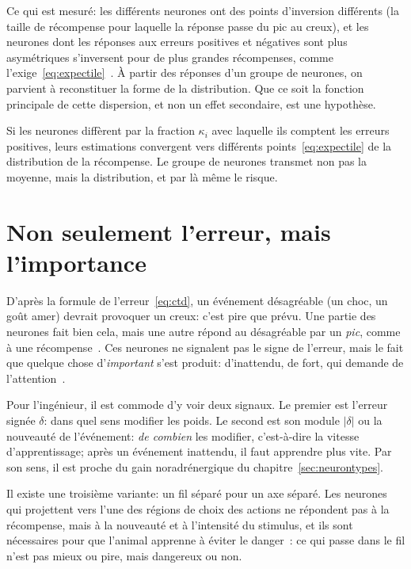 Ce qui est mesuré: les différents neurones  ont des \og points d'inversion\fg{} différents (la taille de récompense pour laquelle la réponse passe du pic au creux), et les neurones dont les réponses aux erreurs positives et négatives sont plus asymétriques s'inversent pour de plus grandes récompenses, comme l'exige~\eqref{eq:expectile}~\cite{Dabney2020}. À partir des réponses d'un groupe de neurones, on parvient à reconstituer la forme de la distribution. Que ce soit la fonction principale de cette dispersion, et non un effet secondaire, est une hypothèse.

\begin{keyblock}
\begin{proposition}
\label{prop:expectile}
Si les neurones  diffèrent par la fraction $\kappa_i$ avec laquelle ils comptent les erreurs positives, leurs estimations convergent vers différents points~\eqref{eq:expectile} de la distribution de la récompense. Le groupe de neurones transmet non pas la moyenne, mais la distribution, et par là même le risque.
\end{proposition}
\end{keyblock}

\section{Non seulement l'erreur, mais l'importance}

D'après la formule de l'erreur~\eqref{eq:ctd}, un événement désagréable (un choc, un goût amer) devrait provoquer un creux: c'est pire que prévu. Une partie des neurones  fait bien cela, mais une autre répond au désagréable par un \emph{pic}, comme à une récompense~\cite{Matsumoto2009}. Ces neurones ne signalent pas le signe de l'erreur, mais le fait que quelque chose d'\emph{important} s'est produit: d'inattendu, de fort, qui demande de l'attention~\cite{BrombergMartin2010}.

Pour l'ingénieur, il est commode d'y voir deux signaux. Le premier est l'erreur signée $\delta$: dans quel sens modifier les poids. Le second est son module $|\delta|$ ou la nouveauté de l'événement: \emph{de combien} les modifier, c'est-à-dire la vitesse d'apprentissage; après un événement inattendu, il faut apprendre plus vite. Par son sens, il est proche du gain noradrénergique du chapitre~\ref{sec:neurontypes}.

Il existe une troisième variante: un fil séparé pour un axe séparé. Les neurones  qui projettent vers l'une des régions de choix des actions ne répondent pas à la récompense, mais à la nouveauté et à l'intensité du stimulus, et ils sont nécessaires pour que l'animal apprenne à éviter le danger~\cite{Menegas2018}: ce qui passe dans le fil n'est pas \og mieux ou pire\fg{}, mais \og dangereux ou non\fg{}.

